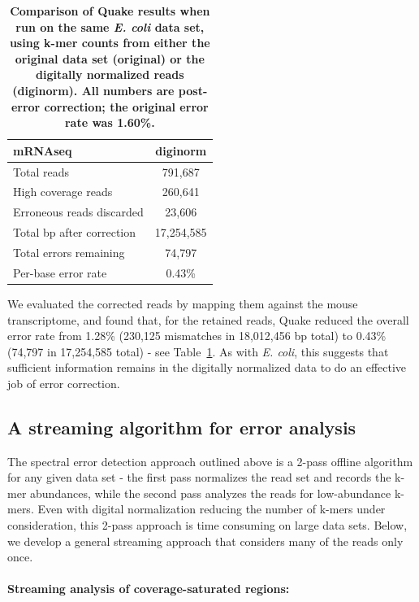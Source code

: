 \documentclass{article}
\begin{document}
\begin{table}
\begin{tabular}{|l|c|}
\hline
{\bf mRNAseq}                    & diginorm \\
\hline
Total reads                      & 791,687 \\
High coverage reads              & 260,641 \\
Erroneous reads discarded        & 23,606 \\
Total bp after correction        & 17,254,585 \\
Total errors remaining           & 74,797 \\
Per-base error rate              & 0.43\% \\
\hline
\end{tabular}

\caption{{\bf Comparison of Quake results when run on the same {\em
      E. coli} data set, using k-mer counts from either the original
    data set (original) or the digitally normalized reads
    (diginorm).  All numbers are post-error correction; the original
    error rate was 1.60\%.}}

\label{tab:quake_mrna}
\end{table}

We evaluated the corrected reads by mapping them against the mouse
transcriptome, and found that, for the retained reads, Quake reduced
the overall error rate from 1.28\% (230,125 mismatches in 18,012,456
bp total) to 0.43\% (74,797 in 17,254,585 total) - see
Table~\ref{tab:quake_mrna}.  As with {\em E. coli}, this suggests that
sufficient information remains in the digitally normalized data to do
an effective job of error correction.

\subsection{A streaming algorithm for error analysis}

The spectral error detection approach outlined above is a 2-pass
offline algorithm for any given data set - the first pass normalizes
the read set and records the k-mer abundances, while the second pass
analyzes the reads for low-abundance k-mers.  Even with digital
normalization reducing the number of k-mers under consideration, this
2-pass approach is time consuming on large data sets.  Below, we
develop a general streaming approach that considers many of the
reads only once.

\paragraph{Streaming analysis of coverage-saturated regions:}
\end{document}
